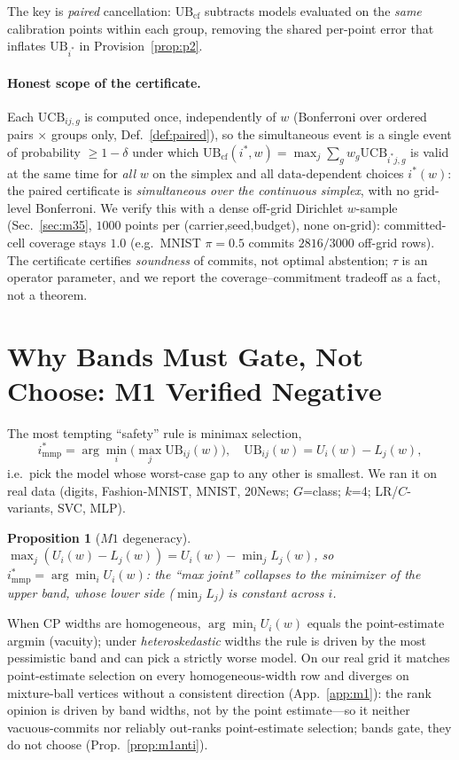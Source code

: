 \documentclass{article}
\newtheorem{proposition}{Proposition}
\begin{document}
The key is \emph{paired} cancellation: $\mathrm{UB}_{\mathrm{cf}}$ subtracts models evaluated
on the \emph{same} calibration points within each group, removing the shared per-point error
that inflates $\mathrm{UB}_{i^*}$ in Provision~\ref{prop:p2}.

\paragraph{Honest scope of the certificate.} Each $\mathrm{UCB}_{ij,g}$ is computed once,
independently of $w$ (Bonferroni over ordered pairs $\times$ groups only, Def.~\ref{def:paired}),
so the simultaneous event is a single event of probability $\ge1-\delta$ under which
$\mathrm{UB}_{\mathrm{cf}}(i^*,w)=\max_j\sum_g w_g\mathrm{UCB}_{i^*j,g}$ is valid at the same
time for \emph{all} $w$ on the simplex and all data-dependent choices $i^*(w)$: the paired
certificate is \emph{simultaneous over the continuous simplex}, with no grid-level Bonferroni.
We verify this with a dense off-grid Dirichlet $w$-sample
(Sec.~\ref{sec:m35}, $1000$ points per (carrier,seed,budget), none on-grid): committed-cell
coverage stays $1.0$ (e.g.\ MNIST $\pi{=}0.5$ commits $2816/3000$ off-grid rows). The
certificate certifies \emph{soundness} of commits, not optimal abstention; $\tau$ is an
operator parameter, and we report the coverage--commitment tradeoff as a fact, not a theorem.

\section{Why Bands Must Gate, Not Choose: M1 Verified Negative}
\label{sec:m1}

The most tempting ``safety'' rule is minimax selection,
\[
  i^*_{\mathrm{mmp}}=\arg\min_i \Big(\max_j \mathrm{UB}_{ij}(w)\Big),\quad
  \mathrm{UB}_{ij}(w)=U_i(w)-L_j(w),
\]
i.e.\ pick the model whose worst-case gap to any other is smallest. We ran it on real data
(digits, Fashion-MNIST, MNIST, 20News; $G$=class; $k$=4; LR/$C$-variants, SVC, MLP).

\begin{proposition}[$M1$ degeneracy]
\label{prop:m1}
$\max_j (U_i(w)-L_j(w)) = U_i(w)-\min_j L_j(w)$, so
$i^*_{\mathrm{mmp}}=\arg\min_i U_i(w)$: the ``max joint'' collapses to the minimizer of the
upper band, whose lower side ($\min_j L_j$) is constant across $i$.
\end{proposition}

When CP widths are homogeneous, $\arg\min_i U_i(w)$ equals the point-estimate argmin
(vacuity); under \emph{heteroskedastic} widths the rule is driven by the most pessimistic
band and can pick a strictly worse model. On our real grid it matches point-estimate
selection on every homogeneous-width row and diverges on mixture-ball vertices without a
consistent direction (App.~\ref{app:m1}): the rank opinion is driven by band widths, not by
the point estimate---so it neither vacuous-commits nor reliably out-ranks point-estimate
selection; bands gate, they do not choose (Prop.~\ref{prop:m1anti}).
\end{document}
